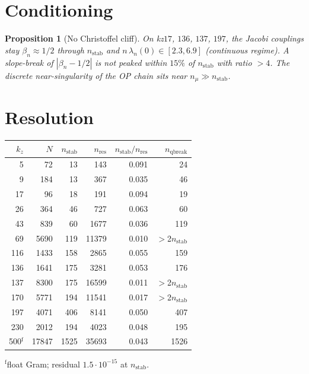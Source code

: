 \documentclass[11pt]{article}
\newtheorem{prop}{Proposition}
\begin{document}
\section{Conditioning}\label{sec:cond}

\begin{prop}[No Christoffel cliff]\label{prop:cond}
On kz$17$, $136$, $137$, $197$, the Jacobi
couplings stay $\beta_n\approx 1/2$ through
$n_{\mathrm{stab}}$ and
$n\,\lambda_n(0)\in[2.3,6.9]$ (continuous
regime).
A slope-break of $|\beta_n-1/2|$ is not
peaked within $15\%$ of $n_{\mathrm{stab}}$
with ratio $>4$.
The discrete near-singularity of the OP
chain sits near $n_{\mu}\gg n_{\mathrm{stab}}$.
\end{prop}

\section{Resolution}\label{sec:res}

\begin{center}
\small
\begin{tabular}{rrrrrr}
\toprule
$k_z$ & $N$ & $n_{\mathrm{stab}}$ & $n_{\mathrm{res}}$
& $n_{\mathrm{stab}}/n_{\mathrm{res}}$ & $n_{\mathrm{qbreak}}$ \\
\midrule
5 & 72 & 13 & 143 & 0.091 & 24 \\
9 & 184 & 13 & 367 & 0.035 & 46 \\
17 & 96 & 18 & 191 & 0.094 & 19 \\
26 & 364 & 46 & 727 & 0.063 & 60 \\
43 & 839 & 60 & 1677 & 0.036 & 119 \\
69 & 5690 & 119 & 11379 & 0.010 & $>$2$n_{\mathrm{stab}}$ \\
116 & 1433 & 158 & 2865 & 0.055 & 159 \\
136 & 1641 & 175 & 3281 & 0.053 & 176 \\
137 & 8300 & 175 & 16599 & 0.011 & $>$2$n_{\mathrm{stab}}$ \\
170 & 5771 & 194 & 11541 & 0.017 & $>$2$n_{\mathrm{stab}}$ \\
197 & 4071 & 406 & 8141 & 0.050 & 407 \\
230 & 2012 & 194 & 4023 & 0.048 & 195 \\
500$^{\mathrm{f}}$ & 17847 & 1525 & 35693 & 0.043 & 1526 \\
\bottomrule
\end{tabular}
\end{center}

$^{\mathrm{f}}$float Gram; residual $1.5\cdot10^{-15}$
at $n_{\mathrm{stab}}$.
\end{document}
